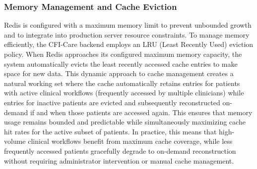 \subsubsection{Memory Management and Cache Eviction}
Redis is configured with a maximum memory limit to prevent unbounded growth and
to integrate into production server resource constraints. To manage memory
efficiently, the CFI-Care backend employs an LRU (Least Recently Used) eviction
policy. When Redis approaches its configured maximum memory capacity, the
system automatically evicts the least recently accessed cache entries to make
space for new data. This dynamic approach to cache management creates a natural
working set where the cache automatically retains entries for patients with
active clinical workflows (frequently accessed by multiple clinicians) while
entries for inactive patients are evicted and subsequently reconstructed
on-demand if and when those patients are accessed again. This ensures that
memory usage remains bounded and predictable while simultaneously maximizing
cache hit rates for the active subset of patients. In practice, this means that
high-volume clinical workflows benefit from maximum cache coverage, while less
frequently accessed patients gracefully degrade to on-demand reconstruction
without requiring administrator intervention or manual cache management.
